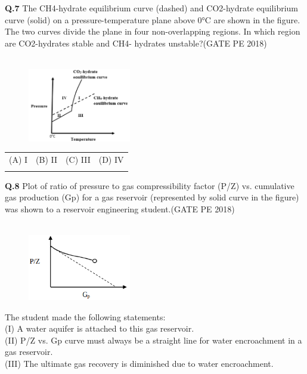 \documentclass[12pt,a4paper]{article}
\begin{document}
\pagebreak

\noindent
\textbf{Q.7}\hspace{0.5em} The CH4-hydrate equilibrium curve (dashed) and CO2-hydrate equilibrium curve (solid) on
a pressure-temperature plane above 0°C are shown in the figure. The two curves divide the
plane in four non-overlapping regions. In which region are CO2-hydrates stable and CH4-
hydrates unstable?\hfill(GATE PE 2018)\\\\

\begin{figure}[h!]
  \centering
  \includegraphics[width=0.4\textwidth]{pic3.png} 
\end{figure}
\begin{center}
\begin{tabular}{llll}
	(A) I & \hspace{0.5em}(B) II & \hspace{0.5em}(C) III & \hspace{0.5em}(D) IV \\\\
\end{tabular}
\end{center}

\noindent
\textbf{Q.8} \hspace{0.5em} Plot of ratio of pressure to gas compressibility factor (P/Z) vs. cumulative gas production
(Gp) for a gas reservoir (represented by solid curve in the figure) was shown to a reservoir
engineering student.\hfill(GATE PE 2018)\\\\

\begin{figure}[h!]
  \centering
  \includegraphics[width=0.4\textwidth]{pic4.png} 
\end{figure}
\noindent
The student made the following statements:\\
(I) A water aquifer is attached to this gas reservoir.\\
(II) P/Z vs. Gp curve must always be a straight line for water encroachment in a gas
reservoir.\\
(III) The ultimate gas recovery is diminished due to water encroachment.\\\\
\end{document}
